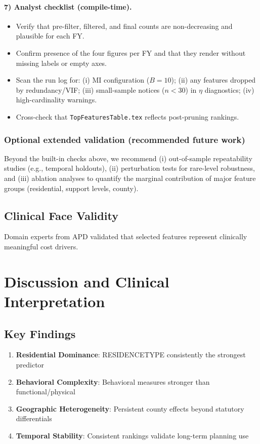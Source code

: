 \paragraph{7) Analyst checklist (compile-time).}
\begin{itemize}
  \item Verify that pre-filter, filtered, and final counts are non-decreasing and plausible for each FY.
  \item Confirm presence of the four figures per FY and that they render without missing labels or empty axes.
  \item Scan the run log for: (i) MI configuration (\(B{=}10\)); (ii) any features dropped by redundancy/VIF; (iii) small-sample notices (\(n{<}30\)) in \(\eta\) diagnostics; (iv) high-cardinality warnings.
  \item Cross-check that \texttt{TopFeaturesTable.tex} reflects post-pruning rankings.
\end{itemize}

\subsubsection*{Optional extended validation (recommended future work)}
Beyond the built-in checks above, we recommend (i) out-of-sample repeatability studies (e.g., temporal holdouts), (ii) perturbation tests for rare-level robustness, and (iii) ablation analyses to quantify the marginal contribution of major feature groups (residential, support levels, county).


\subsection{Clinical Face Validity}

Domain experts from APD validated that selected features represent clinically meaningful cost drivers.

\section{Discussion and Clinical Interpretation}

\subsection{Key Findings}

\begin{enumerate}
    \item \textbf{Residential Dominance}: RESIDENCETYPE consistently the strongest predictor
    \item \textbf{Behavioral Complexity}: Behavioral measures stronger than functional/physical
    \item \textbf{Geographic Heterogeneity}: Persistent county effects beyond statutory differentials
    \item \textbf{Temporal Stability}: Consistent rankings validate long-term planning use
\end{enumerate}

